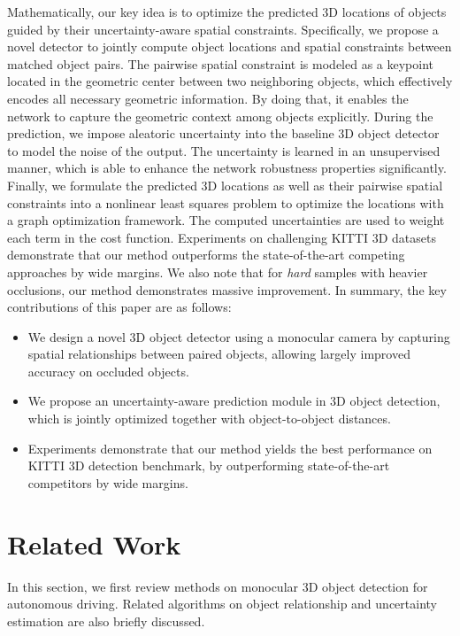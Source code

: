 \documentclass[10pt,twocolumn,letterpaper]{article}
\begin{document}
Mathematically, our key idea is to optimize the predicted 3D locations of objects guided by their uncertainty-aware spatial constraints.
Specifically, we propose a novel detector to jointly compute object locations and spatial constraints between matched object pairs.
The pairwise spatial constraint is modeled as a keypoint located in the geometric center between two neighboring objects, which effectively encodes all necessary geometric information. By doing that,
it enables the network to capture the geometric context among objects explicitly.
During the prediction, we impose aleatoric uncertainty into the baseline 3D object detector to model the noise of the output.
The uncertainty is learned in an unsupervised manner, which is able to enhance the network robustness properties significantly.
Finally, we formulate the predicted 3D locations as well as their pairwise spatial constraints into a nonlinear least squares problem to optimize the locations with a graph optimization framework. The computed uncertainties are used to weight each term in the cost function.
Experiments on challenging KITTI 3D datasets demonstrate that our method outperforms the state-of-the-art competing approaches by wide margins. We also note that for \textit{hard} samples with heavier occlusions, our method demonstrates massive improvement.
In summary, the key contributions of this paper are as follows:
\begin{itemize}
	\item We design a novel 3D object detector using a monocular camera by capturing spatial relationships between paired objects, allowing largely improved accuracy on occluded objects.
\item We propose an uncertainty-aware prediction module in 3D object detection, which is jointly optimized together with object-to-object distances.
  \item
	Experiments demonstrate that our method yields the best performance on KITTI 3D detection benchmark, by outperforming state-of-the-art competitors by wide margins.
\end{itemize}
 \section{Related Work}
\label{sec:related}
In this section, we first review methods on monocular 3D object detection for autonomous driving. Related algorithms on object relationship and uncertainty estimation are also briefly discussed.
\end{document}
